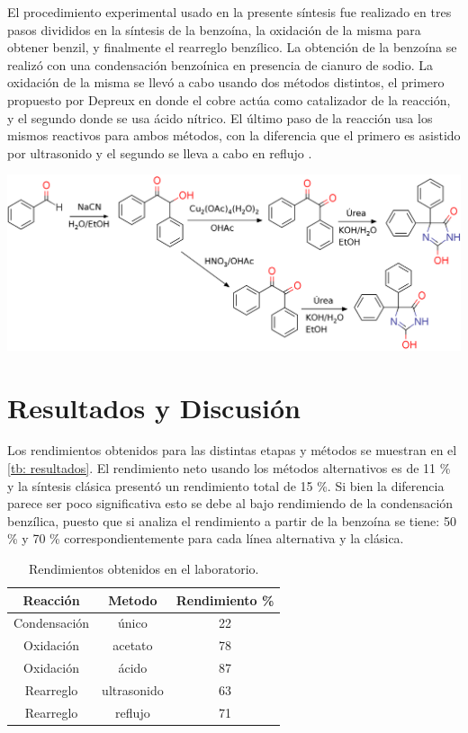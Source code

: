 \documentclass[fleqn,10pt]{SelfArx}
\begin{document}
El procedimiento experimental usado en la presente s\'intesis fue realizado en tres pasos divididos en la s\'intesis de la benzo\'ina, la oxidaci\'on de la misma para obtener benzil, y finalmente el rearreglo benz\'ilico. La obtenci\'on de la benzo\'ina se realiz\'o con una condensaci\'on benzo\'inica en presencia de cianuro de sodio. La oxidaci\'on de la misma se llev\'o a cabo usando dos m\'etodos distintos, el primero propuesto por Depreux \cite{depreux1988} en donde el cobre act\'ua como catalizador de la reacci\'on, y el segundo donde se usa \'acido n\'itrico. El \'ultimo paso de la reacci\'on usa los mismos reactivos para ambos m\'etodos, con la diferencia que el primero es asistido por ultrasonido y el segundo se lleva a cabo en reflujo \cite{safari2010}.
\begin{scheme}[h]
	\centering
	\caption{S\'intesis del Dilantin con las dos rutas seguidas en el laboratorio.}
	\includegraphics[width=\linewidth]{structures/complete.png}
\end{scheme}


\newpage
\section{Resultados y Discusi\'on}
Los rendimientos obtenidos para las distintas etapas y m\'etodos se muestran en el \autoref{tb: resultados}. El rendimiento neto usando los m\'etodos alternativos es de 11 \% y la s\'intesis cl\'asica present\'o un rendimiento total de 15 \%. Si bien la diferencia parece ser poco significativa esto se debe al bajo rendimiendo de la condensaci\'on benz\'ilica, puesto que si analiza el rendimiento a partir de la benzo\'ina se tiene: 50 \% y 70 \% correspondientemente para cada l\'inea alternativa y la cl\'asica.
\begin{table}[h]
	\centering
	\caption{Rendimientos obtenidos en el laboratorio.}
	\label{tb: resultados}
	\begin{tabular}{ccc}
		\hline
		\textbf{Reacci\'on} & \textbf{Metodo} & \textbf{Rendimiento \%} \\
		\hline
		Condensaci\'on & \'unico & 22 \\
		Oxidaci\'on & acetato & 78 \\
		Oxidaci\'on & \'acido & 87 \\
		Rearreglo & ultrasonido & 63 \\
		Rearreglo & reflujo & 71 \\
		\hline
	\end{tabular}
\end{table}
\end{document}
